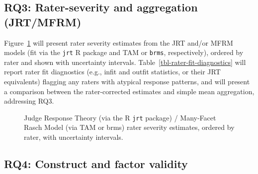 \documentclass[
  12pt,
]{article}
\begin{document}
\begin{table}

\caption{\label{tbl-expertise-effects}Mixed-model estimates of rater
expertise as a predictor of rating level/variance, with
rater/player/match random effects.}

\centering{

}

\end{table}%

\subsection{RQ3: Rater-severity and aggregation
(JRT/MFRM)}\label{rq3-rater-severity-and-aggregation-jrtmfrm}

Figure~\ref{fig-rater-severity-jrt} will present rater severity
estimates from the JRT and/or MFRM models (fit via the \texttt{jrt} R
package and TAM or \texttt{brms}, respectively), ordered by rater and
shown with uncertainty intervals. Table~\ref{tbl-rater-fit-diagnostics}
will report rater fit diagnostics (e.g., infit and outfit statistics, or
their JRT equivalents) flagging any raters with atypical response
patterns, and will present a comparison between the rater-corrected
estimates and simple mean aggregation, addressing RQ3.

\begin{figure}

\centering{

}

\caption{\label{fig-rater-severity-jrt}Judge Response Theory (via the R
\texttt{jrt} package) / Many-Facet Rasch Model (via TAM or brms) rater
severity estimates, ordered by rater, with uncertainty intervals.}

\end{figure}%

\begin{table}

\caption{\label{tbl-rater-fit-diagnostics}Rater fit diagnostics (e.g.,
infit/outfit statistics or JRT-equivalent) flagging raters with atypical
response patterns.}

\centering{

}

\end{table}%

\subsection{RQ4: Construct and factor
validity}\label{rq4-construct-and-factor-validity}
\end{document}
